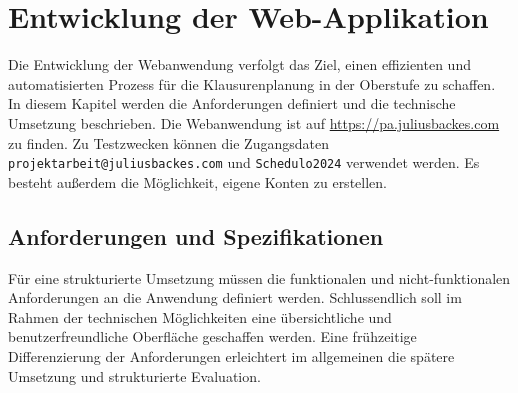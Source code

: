 \newpage
\section{Entwicklung der Web-Applikation}
Die Entwicklung der Webanwendung verfolgt das Ziel, einen effizienten und automatisierten Prozess für die Klausurenplanung in der Oberstufe zu schaffen. In diesem Kapitel werden die Anforderungen definiert und die technische Umsetzung beschrieben. Die Webanwendung ist auf \url{https://pa.juliusbackes.com} zu finden. Zu Testzwecken können die Zugangsdaten \texttt{projektarbeit@juliusbackes.com} und \texttt{Schedulo2024} verwendet werden. Es besteht außerdem die Möglichkeit, eigene Konten zu erstellen.
\subsection{Anforderungen und Spezifikationen}
Für eine strukturierte Umsetzung müssen die funktionalen und nicht-funktionalen Anforderungen an die Anwendung definiert werden. Schlussendlich soll im Rahmen der technischen Möglichkeiten eine übersichtliche und benutzerfreundliche Oberfläche geschaffen werden. Eine frühzeitige Differenzierung der Anforderungen erleichtert im allgemeinen die spätere Umsetzung und strukturierte Evaluation.
